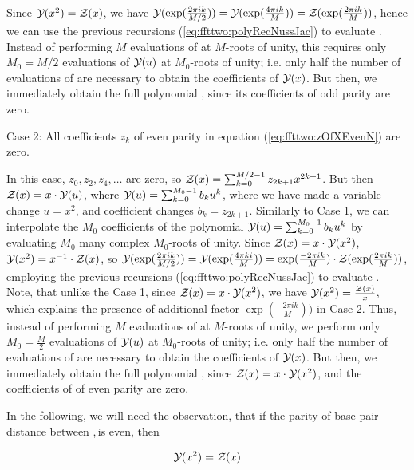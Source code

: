 Since ${\mathcal Y}_{}(x^2)={\mathcal Z}_{}(x)$, we have
${\mathcal Y}_{}(\exp(\frac{2\pi i k}{M/2})) =
{\mathcal Y}_{}(\exp(\frac{4\pi i k}{M})) =
{\mathcal Z}_{}(\exp(\frac{2\pi i k}{M}))$, hence we can
use the previous recursions (\ref{eq:ffttwo:polyRecNussJac})
to evaluate .  Instead of
performing $M$ evaluations of \emZ{} at $M$-roots of unity,
this requires only $M_0=M/2$ evaluations of ${\mathcal Y}_{}(u)$ at
$M_0$-roots of unity; i.e. only half the number of
evaluations of \emZ{} are necessary to
obtain the coefficients of ${\mathcal Y}_{}(x)$. But then, we immediately obtain the
full polynomial \emZ{}, since its coefficients of odd parity are zero.

\medskip
{\sc Case 2}: All coefficients $z_k$ of even parity in
equation (\ref{eq:ffttwo:zOfXEvenN}) are zero.
\smallskip

In this case, $z_0,z_2,z_4,\dots$ are zero, so
${\mathcal Z}_{}(x) = \sum_{k=0}^{M/2-1} z_{2k+1} x^{2k+1}$. But then
${\mathcal Z}_{}(x) = x \cdot {\mathcal Y}_{}(u)$, where
${\mathcal Y}_{}(u)= \sum_{k=0}^{M_0-1} b_k u^k$, where we have made
a variable change $u=x^2$, and coefficient changes
$b_k = z_{2k+1}$. Similarly to Case 1,
we can interpolate the $M_0$ coefficients of the polynomial
${\mathcal Y}_{}(u) = \sum_{k=0}^{M_0-1} b_k u^k$
by evaluating $M_0$ many complex $M_0$-roots
of unity.  Since ${\mathcal Z}_{}(x)=x \cdot {\mathcal Y}_{}(x^2)$, ${\mathcal Y}_{}(x^2) = x^{-1} \cdot {\mathcal Z}_{}(x)$,
so
${\mathcal Y}_{}(\exp(\frac{2\pi i k}{M/2})) = {\mathcal Y}_{}(\exp(\frac{4\pi ki}{M})) =
\exp(\frac{-2\pi i k}{M}) \cdot
{\mathcal Z}_{}(\exp(\frac{2\pi i k}{M}))$, employing
the previous recursions (\ref{eq:ffttwo:polyRecNussJac})
to evaluate .  Note, that unlike the
Case 1, since ${\mathcal Z}_{}(x) = x \cdot {\mathcal Y}_{}(x^2)$, we have
${\mathcal Y}_{}(x^2)=\frac{{\mathcal Z}_{}(x)}{x}$, which explains the presence of additional factor
$\exp(\frac{-2\pi i k}{M}))$ in Case 2.  Thus, instead of
performing $M$ evaluations of \emZ{} at $M$-roots of unity,
we perform only $M_0=\frac{M}{2}$ evaluations of ${\mathcal Y}_{}(u)$ at
$M_0$-roots of unity; i.e. only half the number of
evaluations of \emZ{} are necessary to
obtain the coefficients of ${\mathcal Y}_{}(x)$. But then, we immediately obtain the
full polynomial \emZ{}, since ${\mathcal Z}_{}(x) = x \cdot {\mathcal Y}_{}(x^2)$, and the
coefficients of \emZ{} of even parity are zero.

In the following, we will need the observation, that if the parity of
base pair distance \dBP{\strA}{\strB} between \strA,\,\strB is
even, then

\begin{align}
\label{eq:ffttwo:evenY}
\emYof{}{x^2} = \emZ{}
\end{align}

